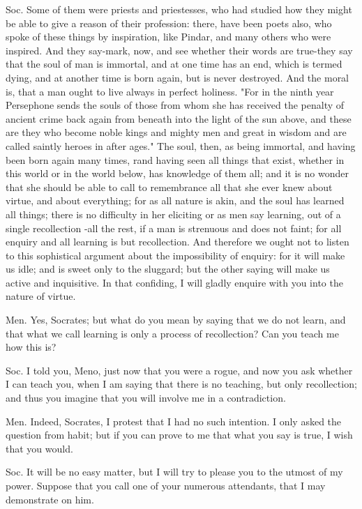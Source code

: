 Soc. Some of them were priests and priestesses, who had studied how
they might be able to give a reason of their profession: there, have
been poets also, who spoke of these things by inspiration, like Pindar,
and many others who were inspired. And they say-mark, now, and see
whether their words are true-they say that the soul of man is immortal,
and at one time has an end, which is termed dying, and at another
time is born again, but is never destroyed. And the moral is, that
a man ought to live always in perfect holiness. "For in the ninth
year Persephone sends the souls of those from whom she has received
the penalty of ancient crime back again from beneath into the light
of the sun above, and these are they who become noble kings and mighty
men and great in wisdom and are called saintly heroes in after ages."
The soul, then, as being immortal, and having been born again many
times, rand having seen all things that exist, whether in this world
or in the world below, has knowledge of them all; and it is no wonder
that she should be able to call to remembrance all that she ever knew
about virtue, and about everything; for as all nature is akin, and
the soul has learned all things; there is no difficulty in her eliciting
or as men say learning, out of a single recollection -all the rest,
if a man is strenuous and does not faint; for all enquiry and all
learning is but recollection. And therefore we ought not to listen
to this sophistical argument about the impossibility of enquiry: for
it will make us idle; and is sweet only to the sluggard; but the other
saying will make us active and inquisitive. In that confiding, I will
gladly enquire with you into the nature of virtue. 

Men. Yes, Socrates; but what do you mean by saying that we do not
learn, and that what we call learning is only a process of recollection?
Can you teach me how this is? 

Soc. I told you, Meno, just now that you were a rogue, and now you
ask whether I can teach you, when I am saying that there is no teaching,
but only recollection; and thus you imagine that you will involve
me in a contradiction. 

Men. Indeed, Socrates, I protest that I had no such intention. I only
asked the question from habit; but if you can prove to me that what
you say is true, I wish that you would. 

Soc. It will be no easy matter, but I will try to please you to the
utmost of my power. Suppose that you call one of your numerous attendants,
that I may demonstrate on him. 


